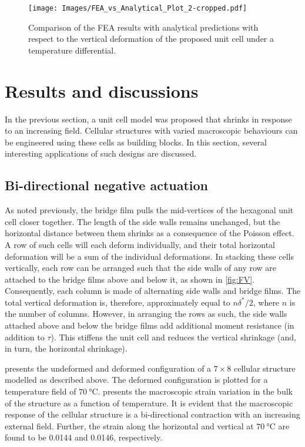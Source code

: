 \documentclass[final,times,5p]{elsarticle}
\numberwithin{equation}{section}
\begin{document}
 \begin{figure*}[htpb]
    \centering
    \texttt{[image: Images/FEA\_vs\_Analytical\_Plot\_2-cropped.pdf]}
    \caption{Comparison of the FEA results with analytical predictions with respect to the vertical deformation of the proposed unit cell under a temperature differential.}
    \label{fig:TempPlots}
 \end{figure*}

\section{Results and discussions}
In the previous section, a unit cell model was proposed that shrinks in response to an increasing field. Cellular structures with varied macroscopic behaviours can be engineered using these cells as building blocks. In this section, several interesting applications of such designs are discussed.

\subsection{Bi-directional negative actuation}
As noted previously, the bridge film pulls the mid-vertices of the hexagonal unit cell closer together. The length of the side walls remains unchanged, but the horizontal distance between them shrinks as a consequence of the Poisson effect. A row of such cells will each deform individually, and their total horizontal deformation will be a sum of the individual deformations. In stacking these cells vertically, each row can be arranged such that the side walls of any row are attached to the bridge films above and below it, as shown in \cref{fig:FV}. Consequently, each column is made of alternating side walls and bridge films. The total vertical deformation is, therefore, approximately equal to $n \delta^*/2$, where $n$ is the number of columns. However, in arranging the rows as such, the side walls attached above and below the bridge films add additional moment resistance (in addition to $\tau$). This stiffens the unit cell and reduces the vertical shrinkage (and, in turn, the horizontal shrinkage). 

 presents the undeformed and deformed configuration of a $7\times8$ cellular structure modelled as described above. The deformed configuration is plotted for a temperature field of $\SI{70}{\degreeCelsius}$.  presents the macroscopic strain variation in the bulk of the structure as a function of temperature. It is evident that the macroscopic response of the cellular structure is a bi-directional contraction with an increasing external field. Further, the strain along the horizontal and vertical at $\SI{70}{\degreeCelsius}$ are found to be 0.0144 and 0.0146, respectively. 
\end{document}
